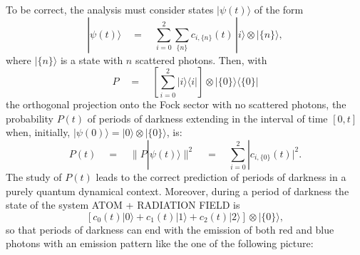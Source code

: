 \documentclass[10pt,a4paper]{article}
\begin{document}
To be correct, the analysis  must consider states
$|\psi(t)\rangle$ of the form
\begin{equation}
|\psi(t)\rangle \quad = \quad \sum_{i=0}^{2} \sum_{\{ n \}} c_{i,
\{n\}}(t)\, |i\rangle \otimes |\{n\}\rangle,
\end{equation}
where $|\{n\}\rangle$ is a state with $n$ scattered photons. Then,
with
\begin{equation}
P \quad = \quad \left[ \sum_{i=0}^{2} |i\rangle\langle i|
\right]\otimes |\{0\}\rangle\langle\{0\}|
\end{equation}
the orthogonal projection onto the Fock sector with no scattered
photons, the probability $P(t)$ of periods of darkness extending
in the interval of time $[0, t]$ when, initially, $|\psi(0)\rangle
= |0\rangle\otimes |\{0\}\rangle$, is:
\begin{equation}
P(t) \quad = \quad \| P |\psi(t)\rangle \|^{2} \quad = \quad
\sum_{i=0}^{2} |c_{i, \{0\}}(t)|^{2}.
\end{equation}
The study of $P(t)$ leads to the correct prediction of periods of
darkness in a purely quantum dynamical context. Moreover, during a
period of darkness the state of the system ATOM + RADIATION FIELD
is
\begin{equation}
\left[ c_{0}(t) |0\rangle + c_{1}(t) |1\rangle + c_{2}(t)
|2\rangle \right] \otimes |\{0\}\rangle,
\end{equation}
so that periods of darkness can end with the emission of both red
and blue photons with an emission pattern like the one of the following
picture:
\end{document}
